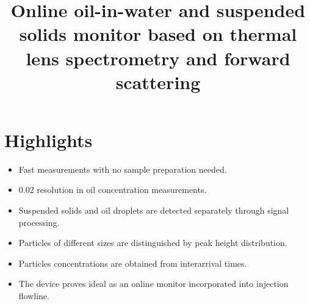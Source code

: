 \documentclass[10pt,authoryear,onecolumn]{article}
\begin{document}


%
%
%
%
%
%
%
%
%
%
%
%
%


\title{Online oil-in-water and suspended solids monitor based on thermal lens spectrometry and forward scattering}
\author{}
\date{}

\maketitle

\section*{Highlights}

\begin{itemize}
	\item Fast measurements with no sample preparation needed.
	\item \SI{0.02}{\ppm} resolution in oil concentration measurements.
	\item Suspended solids and oil droplets are detected separately through signal processing.
	\item Particles of different sizes are distinguished by peak height distribution.
	\item Particles concentrations are obtained from interarrival times.
	\item The device proves ideal as an online monitor incorporated into injection flowline.
\end{itemize}
\end{document}
